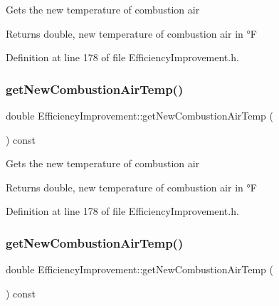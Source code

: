 Gets the new temperature of combustion air

\begin{DoxyReturn}{Returns}
double, new temperature of combustion air in °F 
\end{DoxyReturn}


Definition at line 178 of file Efficiency\+Improvement.\+h.

\mbox{\label{class_efficiency_improvement_a6a699fe87fec378962c2ee1505600dce}} 
\subsubsection{\texorpdfstring{get\+New\+Combustion\+Air\+Temp()}{getNewCombustionAirTemp()}\hspace{0.1cm}{\footnotesize\ttfamily [2/3]}}
{\footnotesize\ttfamily double Efficiency\+Improvement\+::get\+New\+Combustion\+Air\+Temp (\begin{DoxyParamCaption}{ }\end{DoxyParamCaption}) const\hspace{0.3cm}{\ttfamily [inline]}}

Gets the new temperature of combustion air

\begin{DoxyReturn}{Returns}
double, new temperature of combustion air in °F 
\end{DoxyReturn}


Definition at line 178 of file Efficiency\+Improvement.\+h.

\mbox{\label{class_efficiency_improvement_a6a699fe87fec378962c2ee1505600dce}} 
\subsubsection{\texorpdfstring{get\+New\+Combustion\+Air\+Temp()}{getNewCombustionAirTemp()}\hspace{0.1cm}{\footnotesize\ttfamily [3/3]}}
{\footnotesize\ttfamily double Efficiency\+Improvement\+::get\+New\+Combustion\+Air\+Temp (\begin{DoxyParamCaption}{ }\end{DoxyParamCaption}) const\hspace{0.3cm}{\ttfamily [inline]}}

